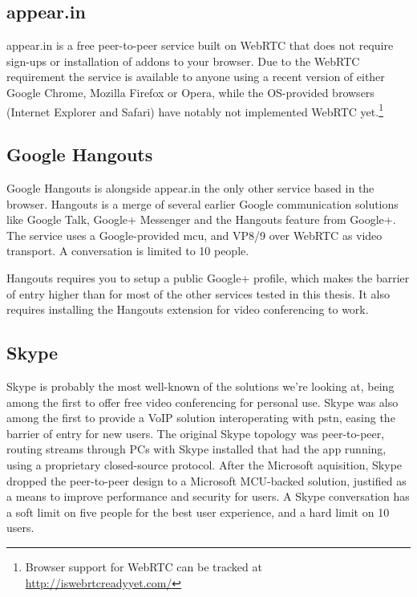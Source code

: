 \subsection{appear.in}

appear.in is a free peer-to-peer service built on WebRTC that does not require sign-ups or installation of addons to your browser. Due to the WebRTC requirement the service is available to anyone using a recent version of either Google Chrome, Mozilla Firefox or Opera, while the OS-provided browsers (Internet Explorer and Safari) have notably not implemented WebRTC yet.\footnote{Browser support for WebRTC can be tracked at \url{http://iswebrtcreadyyet.com/}}



\subsection{Google Hangouts}

Google Hangouts is alongside appear.in the only other service based in the browser. Hangouts is a merge of several earlier Google communication solutions like Google Talk, Google+ Messenger and the Hangouts feature from Google+. The service uses a Google-provided \gls{mcu}, and VP8/9 over WebRTC as video transport. A conversation is limited to 10 people.

Hangouts requires you to setup a public Google+ profile, which makes the barrier of entry higher than for most of the other services tested in this thesis. It also requires installing the Hangouts extension for video conferencing to work.


\subsection{Skype}

Skype is probably the most well-known of the solutions we're looking at, being among the first to offer free video conferencing for personal use. Skype was also among the first to provide a VoIP solution interoperating with \gls{pstn}, easing the barrier of entry for new users. The original Skype topology was peer-to-peer, routing streams through PCs with Skype installed that had the app running, using a proprietary closed-source protocol. After the Microsoft aquisition, Skype dropped the peer-to-peer design to a Microsoft MCU-backed solution, justified as a means to improve performance and security for users. A Skype conversation has a soft limit on five people for the best user experience, and a hard limit on 10 users.

